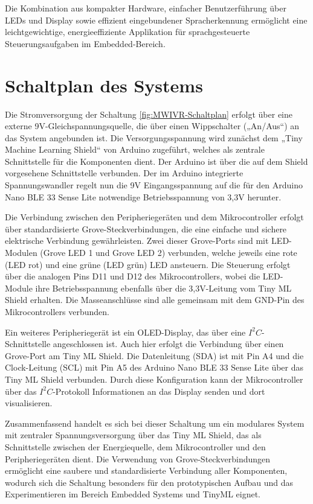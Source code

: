 \bigskip

Die Kombination aus kompakter Hardware, einfacher Benutzerführung über LEDs und Display sowie effizient eingebundener Spracherkennung ermöglicht eine leichtgewichtige, energieeffiziente Applikation für sprachgesteuerte Steuerungsaufgaben im Embedded-Bereich.

\chapter{Schaltplan des Systems} \label{sec:Schaltplan des Systems}

Die Stromversorgung der Schaltung \ref{fig:MWIVR-Schaltplan} erfolgt über eine externe 9V-Gleichspannungsquelle, die über einen Wippschalter („An/Aus“) an das System angebunden ist. Die Versorgungsspannung wird zunächst dem „Tiny Machine Learning Shield“ von Arduino zugeführt, welches als zentrale Schnittstelle für die Komponenten dient. Der Arduino ist über die auf dem Shield vorgesehene Schnittstelle verbunden. Der im Arduino integrierte Spannungswandler regelt nun die 9V Eingangsspannung auf die für den Arduino Nano BLE 33 Sense Lite notwendige Betriebsspannung von 3,3V herunter.

\bigskip

Die Verbindung zwischen den Peripheriegeräten und dem Mikrocontroller erfolgt über standardisierte Grove-Steckverbindungen, die eine einfache und sichere elektrische Verbindung gewährleisten. Zwei dieser Grove-Ports sind mit LED-Modulen (Grove LED 1 und Grove LED 2) verbunden, welche jeweils eine rote (LED rot) und eine grüne (LED grün) LED ansteuern. Die Steuerung erfolgt über die analogen Pins D11 und D12 des Mikrocontrollers, wobei die LED-Module ihre Betriebsspannung ebenfalls über die 3,3V-Leitung vom Tiny ML Shield erhalten. Die Masseanschlüsse sind alle gemeinsam mit dem GND-Pin des Mikrocontrollers verbunden.

\bigskip

Ein weiteres Peripheriegerät ist ein OLED-Display, das über eine $I^2C$-Schnittstelle angeschlossen ist. Auch hier erfolgt die Verbindung über einen Grove-Port am Tiny ML Shield. Die Datenleitung (SDA) ist mit Pin A4 und die Clock-Leitung (SCL) mit Pin A5 des Arduino Nano BLE 33 Sense Lite über das Tiny ML Shield verbunden. Durch diese Konfiguration kann der Mikrocontroller über das $I^2C$-Protokoll Informationen an das Display senden und dort visualisieren.

\bigskip

Zusammenfassend handelt es sich bei dieser Schaltung um ein modulares System mit zentraler Spannungsversorgung über das Tiny ML Shield, das als Schnittstelle zwischen der Energiequelle, dem Mikrocontroller und den Peripheriegeräten dient. Die Verwendung von Grove-Steckverbindungen ermöglicht eine saubere und standardisierte Verbindung aller Komponenten, wodurch sich die Schaltung besonders für den prototypischen Aufbau und das Experimentieren im Bereich Embedded Systems und TinyML eignet.

